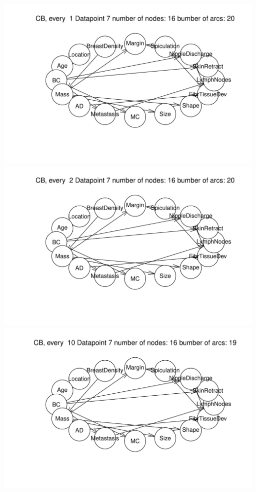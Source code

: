 \documentclass[]{article}
\begin{document}
\includegraphics{BN_Ass2_files/figure-latex/unnamed-chunk-4-4.pdf}
\includegraphics{BN_Ass2_files/figure-latex/unnamed-chunk-4-5.pdf}
\includegraphics{BN_Ass2_files/figure-latex/unnamed-chunk-4-6.pdf}
\end{document}
